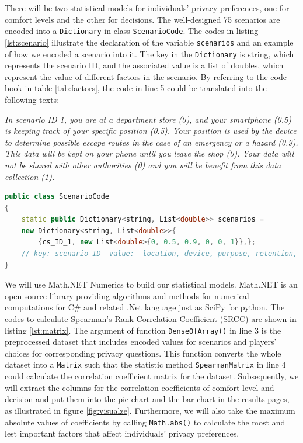 \documentclass[msc,deptreport,ai]{infthesis}      %
\begin{document}
There will be two statistical models for individuals' privacy preferences, one for comfort levels and the other for decisions. The well-designed 75 scenarios are encoded into a \texttt{Dictionary} in class \texttt{ScenarioCode}. The codes in listing \ref{lst:scenario} illustrate the declaration of the variable \texttt{scenarios} and an example of how we encoded a scenario into it. The key in the \texttt{Dictionary} is string, which represents the scenario ID, and the associated value is a list of doubles, which represent the value of different factors in the scenario. By referring to the code book in table \ref{tab:factors}, the code in line 5 could be translated into the following texts: 

\textit{In scenario ID 1, you are at a department store (0), and your smartphone (0.5) is keeping track of your specific position (0.5). Your position is used by the device to determine possible escape routes in the case of an emergency or a hazard (0.9). This data will be kept on your phone until you leave the shop (0). Your data will not be shared with other authorities (0) and you will be benefit from this data collection (1).}

\begin{lstlisting}[caption=Scenario code example,label={lst:scenario},language=C++]
public class ScenarioCode
{
    static public Dictionary<string, List<double>> scenarios = 
    new Dictionary<string, List<double>>{
        {cs_ID_1, new List<double>{0, 0.5, 0.9, 0, 0, 1}},};
    // key: scenario ID  value:  location, device, purpose, retention, shared, benefit
}
\end{lstlisting}

We will use Math.NET Numerics to build our statistical models. Math.NET is an open source library providing algorithms and methods for numerical computations for C\# and related .Net language just as SciPy for python. The codes to calculate Spearman's Rank Correlation Coefficient (SRCC) are shown in listing \ref{lst:matrix}. The argument of function \texttt{DenseOfArray()} in line 3 is the preprocessed dataset that includes encoded values for scenarios and players' choices for corresponding privacy questions. This function converts the whole dataset into a \texttt{Matrix} such that the statistic method \texttt{SpearmanMatrix} in line 4 could calculate the correlation coefficient matrix for the dataset. Subsequently, we will extract the columns for the correlation coefficients of comfort level and decision and put them into the pie chart and the bar chart in the results pages, as illustrated in figure \ref{fig:visualze}. Furthermore, we will also take the maximum absolute values of coefficients by calling \texttt{Math.abs()} to calculate the most and lest important factors that affect individuals' privacy preferences.
\end{document}
